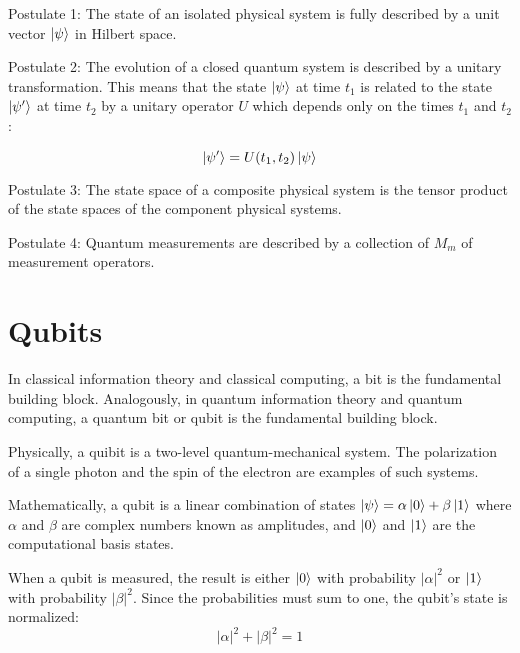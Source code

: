 

Postulate 1: The state of an isolated physical system is fully described by a unit vector $\left|{\psi}\right\rangle$ in Hilbert space.

Postulate 2: The evolution of a closed quantum system is described by a unitary transformation. This means that the state $\left|{\psi}\right\rangle$ at time $t_1$ is related to the state $\left|{\psi'}\right\rangle$ at time $t_2$ by a unitary operator $U$ which depends only on the times $t_1$ and $t_2$:

$$\left|{\psi'}\right\rangle=U(t_1,t_2)\left|{\psi}\right\rangle$$


Postulate 3: The state space of a composite physical system is the tensor product of the state spaces of the component physical systems.

Postulate 4: Quantum measurements are described by a collection of ${M_m}$ of measurement operators.


\section{Qubits}

In classical information theory and classical computing, a bit is the fundamental building block.
Analogously, in quantum information theory and quantum computing, a quantum bit or qubit is the fundamental building block.

Physically, a quibit is a two-level quantum-mechanical system. The polarization of a single photon and the spin of the electron are examples of such systems.

Mathematically, a qubit is a linear combination of states $\left|{\psi}\right\rangle=\alpha\left|{0}\right\rangle+\beta\left|{1}\right\rangle$ where $\alpha$ and $\beta$ are complex numbers known as amplitudes, and $\left|{0}\right\rangle$ and $\left|{1}\right\rangle$ are the computational basis states.

When a qubit is measured, the result is either $\left|{0}\right\rangle$ with probability $|\alpha|^2$ or $\left|{1}\right\rangle$ with probability $|\beta|^2$.
Since the probabilities must sum to one, the qubit's state is normalized:
$$|\alpha|^2+|\beta|^2=1$$

